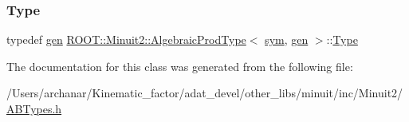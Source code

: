 \mbox{\label{classROOT_1_1Minuit2_1_1AlgebraicProdType_3_01sym_00_01gen_01_4_a963501c089513f1dfae4655d38218487}} 
\subsubsection{\texorpdfstring{Type}{Type}\hspace{0.1cm}{\footnotesize\ttfamily [2/2]}}
{\footnotesize\ttfamily typedef \mbox{\hyperlink{classROOT_1_1Minuit2_1_1gen}{gen}} \mbox{\hyperlink{classROOT_1_1Minuit2_1_1AlgebraicProdType}{R\+O\+O\+T\+::\+Minuit2\+::\+Algebraic\+Prod\+Type}}$<$ \mbox{\hyperlink{classROOT_1_1Minuit2_1_1sym}{sym}}, \mbox{\hyperlink{classROOT_1_1Minuit2_1_1gen}{gen}} $>$\+::\mbox{\hyperlink{classROOT_1_1Minuit2_1_1AlgebraicProdType_3_01sym_00_01gen_01_4_a963501c089513f1dfae4655d38218487}{Type}}}



The documentation for this class was generated from the following file\+:\begin{DoxyCompactItemize}
\item 
/\+Users/archanar/\+Kinematic\+\_\+factor/adat\+\_\+devel/other\+\_\+libs/minuit/inc/\+Minuit2/\mbox{\hyperlink{other__libs_2minuit_2inc_2Minuit2_2ABTypes_8h}{A\+B\+Types.\+h}}\end{DoxyCompactItemize}
